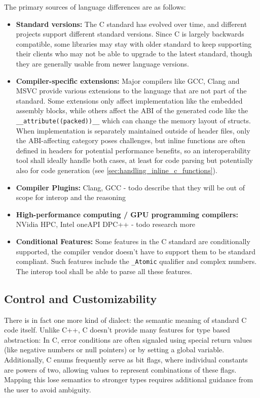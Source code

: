 The primary sources of language differences are as follows:
\begin{itemize}
    \item \textbf{Standard versions:} The C standard has evolved over time, and different projects support different standard versions. Since C is largely backwards compatible, some libraries may stay with older standard to keep supporting their clients who may not be able to upgrade to the latest standard, though they are generally usable from newer language versions.
    \item \textbf{Compiler-specific extensions:} Major compilers like GCC, Clang and MSVC provide various extensions to the language that are not part of the standard. Some extensions only affect implementation like the embedded assembly blocks, while others affect the ABI of the generated code like the \verb|__attribute((packed))__| which can change the memory layout of structs. When implementation is separately maintained outside of header files, only the ABI-affecting category poses challenges, but inline functions are often defined in headers for potential performance benefits, so an interoperability tool shall ideally handle both cases, at least for code parsing but potentially also for code generation (see \autoref{sec:handling_inline_c_functions}).
    \item \textbf{Compiler Plugins:} Clang, GCC - todo describe that they will be out of scope for interop and the reasoning
    \item \textbf{High-performance computing / GPU programming compilers:} NVidia HPC, Intel oneAPI DPC++ - todo research more
    \item \textbf{Conditional Features:} Some features in the C standard are conditionally supported, the compiler vendor doesn't have to support them to be standard compliant. Such features include the \verb|_Atomic| qualifier and complex numbers. The interop tool shall be able to parse all these features.
\end{itemize}

\subsection{Control and Customizability}
There is in fact one more kind of dialect: the semantic meaning of standard C code itself. Unlike C++, C doesn't provide many features for type based abstraction: In C, error conditions are often signaled using special return values (like negative numbers or null pointers) or by setting a global variable. Additionally, C enums frequently serve as bit flags, where individual constants are powers of two, allowing values to represent combinations of these flags. Mapping this lose semantics to stronger types requires additional guidance from the user to avoid ambiguity.

